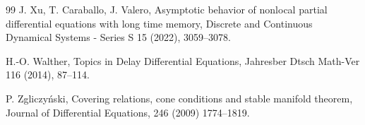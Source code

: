 \documentclass[11pt, leqno]{amsart}
\theoremstyle{definition}
\begin{document}
\begin{thebibliography}{99}
	 J. Xu, T. Caraballo, J. Valero,
Asymptotic behavior of nonlocal partial differential equations with long time memory, Discrete and Continuous Dynamical Systems - Series S 15 (2022), 3059--3078.
	
	
	 H.-O. Walther, Topics in Delay Differential Equations, Jahresber Dtsch Math-Ver 116 (2014), 87--114.
	
	
	 P. Zgliczy\'{n}ski, Covering relations, cone conditions and stable manifold theorem, Journal of Differential Equations, 246 (2009) 1774--1819.
	

	

	
\end{thebibliography}
\end{document}
